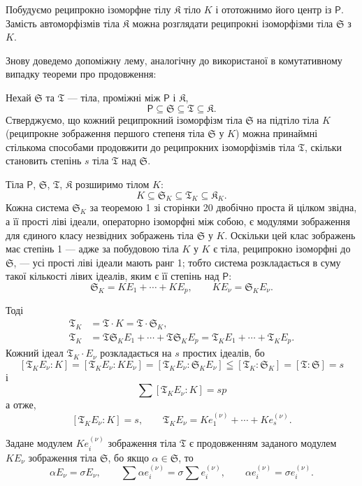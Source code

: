 \documentclass[11pt]{article}
\begin{document}
Побудуємо реципрокно ізоморфне тілу \(\mathfrak K\) тіло \(K\) і ототожнимо його центр із \(\mathsf P\). Замість автоморфізмів тіла \(\mathfrak K\) можна розглядати реципрокні ізоморфізми тіла \(\mathfrak S\) з \(K\).

Знову доведемо допоміжну лему, аналогічну до використаної в комутативному випадку теореми про продовження:

Нехай \(\mathfrak S\) та \(\mathfrak T\) --- тіла, проміжні між \(\mathsf P\) і \(\mathfrak K\),
\[
\mathsf P \subseteq \mathfrak S \subseteq \mathfrak T \subseteq \mathfrak K.
\]
Стверджуємо, що кожний реципрокний ізоморфізм тіла \(\mathfrak S\) на підтіло тіла \(K\) (реципрокне зображення першого степеня тіла \(\mathfrak S\) у \(K\)) можна принаймні стількома способами продовжити до реципрокних ізоморфізмів тіла \(\mathfrak T\), скільки становить степінь \(s\) тіла \(\mathfrak T\) над \(\mathfrak S\).

Тіла \(\mathsf P\), \(\mathfrak S\), \(\mathfrak T\), \(\mathfrak K\) розширимо тілом \(K\):
\[
K\subseteq \mathfrak S_K\subseteq \mathfrak T_K\subseteq \mathfrak K_K.
\]
Кожна система \(\mathfrak S_K\) за теоремою 1 зі сторінки 20 двобічно проста й цілком звідна, а її прості ліві ідеали, операторно ізоморфні між собою, є модулями зображення для єдиного класу незвідних зображень тіла \(\mathfrak S\) у \(K\). Оскільки цей клас зображень має степінь 1 --- адже за побудовою тіла \(K\) у \(K\) є тіла, реципрокно ізоморфні до \(\mathfrak S\), --- усі прості ліві ідеали мають ранг 1; тобто система розкладається в суму такої кількості лівих ідеалів, яким є її степінь над \(\mathsf P\):
\[
\mathfrak S_K=K E_1+\cdots+K E_p,\qquad K E_\nu=\mathfrak S_K E_\nu.
\]

Тоді
\[
\begin{aligned}
\mathfrak T_K&=\mathfrak T\cdot K=\mathfrak T\cdot \mathfrak S_K,\\
\mathfrak T_K&=\mathfrak T\mathfrak S_K E_1+\cdots+\mathfrak T\mathfrak S_K E_p
              =\mathfrak T_K E_1+\cdots+\mathfrak T_K E_p.
\end{aligned}
\]
Кожний ідеал \(\mathfrak T_K\cdot E_\nu\) розкладається на \(s\) простих ідеалів, бо
\[
[\mathfrak T_K E_\nu:K]=[\mathfrak T_K E_\nu:K E_\nu]=[\mathfrak T_K E_\nu:\mathfrak S_K E_\nu]\leqq[\mathfrak T_K:\mathfrak S_K]=[\mathfrak T:\mathfrak S]=s
\]
і
\[
\sum [\mathfrak T_K E_\nu:K]=sp
\]
а отже,
\[
[\mathfrak T_K E_\nu:K]=s,
\qquad
\mathfrak T_K E_\nu=K e_1^{(\nu)}+\cdots+K e_s^{(\nu)}.
\]

Задане модулем \(K e_i^{(\nu)}\) зображення тіла \(\mathfrak T\) є продовженням заданого модулем \(K E_\nu\) зображення тіла \(\mathfrak S\), бо якщо \(\alpha\in \mathfrak S\), то
\[
\alpha E_\nu=\sigma E_\nu,\qquad
\sum \alpha e_i^{(\nu)}=\sigma\sum e_i^{(\nu)},\qquad
\alpha e_i^{(\nu)}=\sigma e_i^{(\nu)}.
\]
\end{document}
